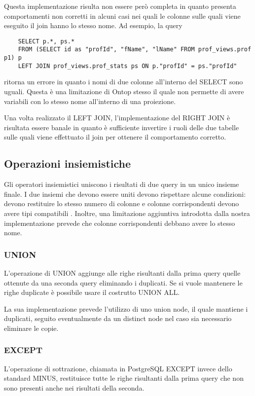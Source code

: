 Questa implementazione risulta non essere però completa in quanto presenta comportamenti non corretti in alcuni casi nei quali le colonne sulle quali viene eseguito il join hanno lo stesso nome.
Ad esempio, la query
\begin{verbatim}
    SELECT p.*, ps.*
    FROM (SELECT id as "profId", "fName", "lName" FROM prof_views.prof p1) p
    LEFT JOIN prof_views.prof_stats ps ON p."profId" = ps."profId"
\end{verbatim}
ritorna un errore in quanto i nomi di due colonne all'interno del SELECT sono uguali. Questa è una limitazione di Ontop stesso il quale non permette di avere variabili
con lo stesso nome all'interno di una proiezione.

Una volta realizzato il LEFT JOIN, l'implementazione del RIGHT JOIN è risultata essere banale in quanto è sufficiente invertire i ruoli delle due tabelle sulle quali viene effettuato
il join per ottenere il comportamento corretto.

\subsection{Operazioni insiemistiche}
Gli operatori insiemistici uniscono i risultati di due query in un unico insieme finale. I due insiemi che devono essere uniti devono rispettare alcune condizioni:
devono restituire lo stesso numero di colonne e colonne corrispondenti devono avere tipi compatibili \cite{PGSetOp}. Inoltre, una limitazione aggiuntiva introdotta dalla nostra
implementazione prevede che colonne corrispondenti debbano avere lo stesso nome.

\subsubsection*{UNION}
L'operazione di UNION aggiunge alle righe risultanti dalla prima query quelle ottenute da una seconda query eliminando i duplicati. Se si vuole mantenere le righe duplicate è possibile
usare il costrutto UNION ALL.

La sua implementazione prevede l'utilizzo di uno union node, il quale mantiene i duplicati, seguito eventualmente da un distinct node nel caso sia necessario eliminare le copie.

\subsubsection*{EXCEPT}
L'operazione di sottrazione, chiamata in PostgreSQL EXCEPT invece dello standard MINUS, restituisce tutte le righe risultanti dalla prima query che non sono presenti anche nei
risultati della seconda.

